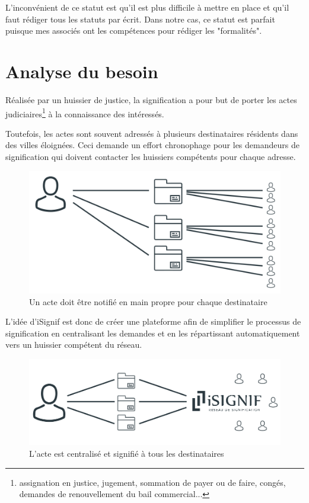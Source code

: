 \documentclass[]{report}
\begin{document}
    L'inconvénient de ce statut est qu'il est plus difficile à mettre en place et qu'il faut rédiger tous les statuts par écrit. Dans notre cas, ce statut est parfait puisque mes associés ont les compétences pour rédiger les "formalités".

  \section{Analyse du besoin}


    Réalisée par un huissier de justice, la signification a pour but de porter les actes judiciaires\footnote{assignation en justice, jugement, sommation de payer ou de faire, congés, demandes de renouvellement du bail commercial...} à la connaissance des intéressés. 

    Toutefois, les actes sont souvent adressés à plusieurs destinataires résidents dans des villes éloignées. Ceci demande un effort chronophage pour les demandeurs de signification qui doivent contacter les huissiers compétents pour chaque adresse.



    \begin{figure}[h!]
      \includegraphics[width=\linewidth]{img/signification_before.png}
      \caption{Un acte doit être notifié en main propre pour chaque destinataire}
    \end{figure}

    L'idée d'iSignif est donc de créer une plateforme afin de simplifier le processus de signification en centralisant les demandes et en les répartissant automatiquement vers un huissier compétent du réseau.

    \begin{figure}[h!]
      \includegraphics[width=\linewidth]{img/signification_after.png}
      \caption{L'acte est centralisé et signifié à tous les destinataires}
    \end{figure}
\end{document}
